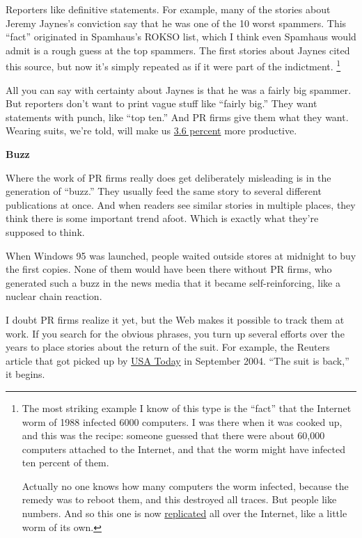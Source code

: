\documentclass[12pt]{book}
\begin{document}
Reporters like definitive statements. For example, many of the stories
about Jeremy Jaynes's conviction say that he was one of the 10 worst
spammers. This ``fact'' originated in Spamhaus's ROKSO list, which I
think even Spamhaus would admit is a rough guess at the top spammers.
The first stories about Jaynes cited this source, but now it's simply
repeated as if it were part of the indictment. \footnote{The most striking example I know of this type is the ``fact''
that the Internet worm of 1988 infected 6000 computers. I was there when
it was cooked up, and this was the recipe: someone guessed that there
were about 60,000 computers attached to the Internet, and that the worm
might have infected ten percent of them.

Actually no one knows how many computers the worm infected, because the
remedy was to reboot them, and this destroyed all traces. But people
like numbers. And so this one is now
\href{http://www.google.com/search?q=internet+worm+1988+6000}{replicated}
all over the Internet, like a little worm of its own.}

All you can say with certainty about Jaynes is that he was a fairly big
spammer. But reporters don't want to print vague stuff like ``fairly
big.'' They want statements with punch, like ``top ten.'' And PR firms
give them what they want. Wearing suits, we're told, will make us
\href{http://sanfrancisco.bizjournals.com/sanfrancisco/stories/2002/02/25/story5.html?t=printable}{3.6
percent} more productive.

\textbf{Buzz}

Where the work of PR firms really does get deliberately misleading is in
the generation of ``buzz.'' They usually feed the same story to several
different publications at once. And when readers see similar stories in
multiple places, they think there is some important trend afoot. Which
is exactly what they're supposed to think.

When Windows 95 was launched, people waited outside stores at midnight
to buy the first copies. None of them would have been there without PR
firms, who generated such a buzz in the news media that it became
self-reinforcing, like a nuclear chain reaction.

I doubt PR firms realize it yet, but the Web makes it possible to track
them at work. If you search for the obvious phrases, you turn up several
efforts over the years to place stories about the return of the suit.
For example, the Reuters article that got picked up by
\href{http://www.usatoday.com/money/industries/retail/2004-09-01-suits_x.htm}{USA
Today} in September 2004. ``The suit is back,'' it begins.
\end{document}
